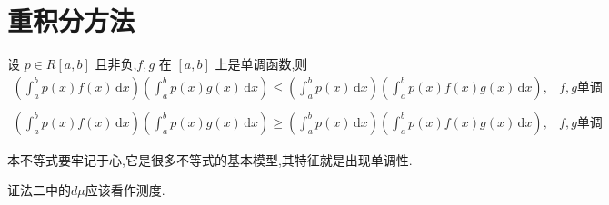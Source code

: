 \documentclass[../../main.tex]{subfiles}
\begin{document}
\section{重积分方法}

\begin{theorem}\label{Chebeshev不等式积分形式}
设 \( p \in R[a,b] \) 且非负,\( f,g \) 在 \([a,b]\) 上是单调函数,则
\begin{align*}
\left( \int_{a}^{b} p(x) f(x) \,\mathrm{d}x \right) \left( \int_{a}^{b} p(x) g(x) \,\mathrm{d}x \right) \leq \left( \int_{a}^{b} p(x) \,\mathrm{d}x \right) \left( \int_{a}^{b} p(x) f(x) g(x) \,\mathrm{d}x \right), & f,g\text{单调性相同} \\
\\
\left( \int_{a}^{b} p(x) f(x) \,\mathrm{d}x \right) \left( \int_{a}^{b} p(x) g(x) \,\mathrm{d}x \right) \geq \left( \int_{a}^{b} p(x) \,\mathrm{d}x \right) \left( \int_{a}^{b} p(x) f(x) g(x) \,\mathrm{d}x \right), & f,g\text{单调性相反}
\nonumber
\end{align*}
\end{theorem}
\begin{note}
本不等式要牢记于心,它是很多不等式的基本模型,其特征就是出现单调性.
\end{note}
\begin{remark}
{\color{blue}证法二}中的$d\mu$应该看作测度.
\end{remark}
\end{document}
